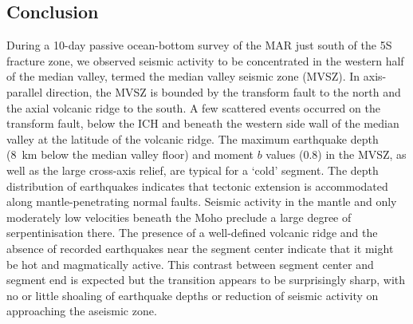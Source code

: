 \documentclass[aguplus]{aguplus}
\newlength{\tw}
\begin{document}
\begin{article}
\section{Conclusion}

During a 10-day passive ocean-bottom survey of the  MAR just south
of the 5\dg S fracture zone, we observed seismic activity to be
concentrated in the western half of the median valley, termed the median valley
seismic zone (MVSZ). In axis-parallel direction, the MVSZ is bounded
by the transform fault to the north and the axial
volcanic ridge to the south.  A few scattered events occurred on the transform
fault, below the ICH and beneath the western side wall of the median
valley at the latitude of the volcanic ridge. The maximum earthquake
depth (8~km below the median valley floor) and moment $b$ values (0.8) in the MVSZ, as well as the large
cross-axis relief, are typical for a `cold' segment.  The depth
distribution of earthquakes indicates that tectonic extension is
accommodated along mantle-penetrating  normal faults.
Seismic activity  in the mantle and only moderately low
velocities beneath the Moho preclude a large degree of
serpentinisation there.
The presence of a well-defined volcanic
ridge and the absence of recorded earthquakes near the segment center
indicate that it might be hot and magmatically active.  This contrast between
segment center and segment end is expected but the transition appears
to be surprisingly sharp, with no or little shoaling of earthquake
depths or reduction of seismic activity on approaching the aseismic
zone.

\ignore{%
}


\end{article}
\end{document}
